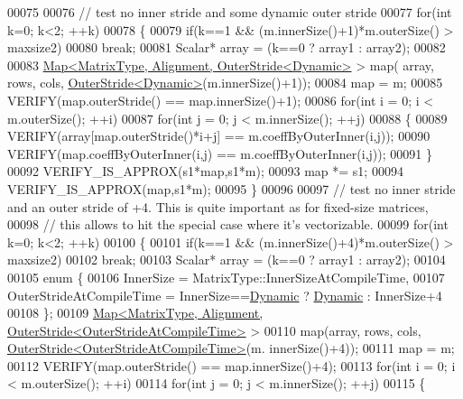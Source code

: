 \begin{DoxyCode}
00075   
00076   \textcolor{comment}{// test no inner stride and some dynamic outer stride}
00077   \textcolor{keywordflow}{for}(\textcolor{keywordtype}{int} k=0; k<2; ++k)
00078   \{
00079     \textcolor{keywordflow}{if}(k==1 && (m.innerSize()+1)*m.outerSize() > maxsize2)
00080       \textcolor{keywordflow}{break};
00081     Scalar* array = (k==0 ? array1 : array2);
00082     
00083     \hyperlink{group___core___module_class_eigen_1_1_map}{Map<MatrixType, Alignment, OuterStride<Dynamic>} > map(
      array, rows, cols, \hyperlink{class_eigen_1_1_outer_stride}{OuterStride<Dynamic>}(m.innerSize()+1));
00084     map = m;
00085     VERIFY(map.outerStride() == map.innerSize()+1);
00086     \textcolor{keywordflow}{for}(\textcolor{keywordtype}{int} i = 0; i < m.outerSize(); ++i)
00087       \textcolor{keywordflow}{for}(\textcolor{keywordtype}{int} j = 0; j < m.innerSize(); ++j)
00088       \{
00089         VERIFY(array[map.outerStride()*i+j] == m.coeffByOuterInner(i,j));
00090         VERIFY(map.coeffByOuterInner(i,j) == m.coeffByOuterInner(i,j));
00091       \}
00092     VERIFY\_IS\_APPROX(s1*map,s1*m);
00093     map *= s1;
00094     VERIFY\_IS\_APPROX(map,s1*m);
00095   \}
00096 
00097   \textcolor{comment}{// test no inner stride and an outer stride of +4. This is quite important as for fixed-size matrices,}
00098   \textcolor{comment}{// this allows to hit the special case where it's vectorizable.}
00099   \textcolor{keywordflow}{for}(\textcolor{keywordtype}{int} k=0; k<2; ++k)
00100   \{
00101     \textcolor{keywordflow}{if}(k==1 && (m.innerSize()+4)*m.outerSize() > maxsize2)
00102       \textcolor{keywordflow}{break};
00103     Scalar* array = (k==0 ? array1 : array2);
00104     
00105     \textcolor{keyword}{enum} \{
00106       InnerSize = MatrixType::InnerSizeAtCompileTime,
00107       OuterStrideAtCompileTime = InnerSize==\hyperlink{namespace_eigen_ad81fa7195215a0ce30017dfac309f0b2}{Dynamic} ? \hyperlink{namespace_eigen_ad81fa7195215a0ce30017dfac309f0b2}{Dynamic} : InnerSize+4
00108     \};
00109     \hyperlink{group___core___module_class_eigen_1_1_map}{Map<MatrixType, Alignment, OuterStride<OuterStrideAtCompileTime>}
       >
00110       map(array, rows, cols, \hyperlink{class_eigen_1_1_outer_stride}{OuterStride<OuterStrideAtCompileTime>}(m.
      innerSize()+4));
00111     map = m;
00112     VERIFY(map.outerStride() == map.innerSize()+4);
00113     \textcolor{keywordflow}{for}(\textcolor{keywordtype}{int} i = 0; i < m.outerSize(); ++i)
00114       \textcolor{keywordflow}{for}(\textcolor{keywordtype}{int} j = 0; j < m.innerSize(); ++j)
00115       \{

\end{DoxyCode}
